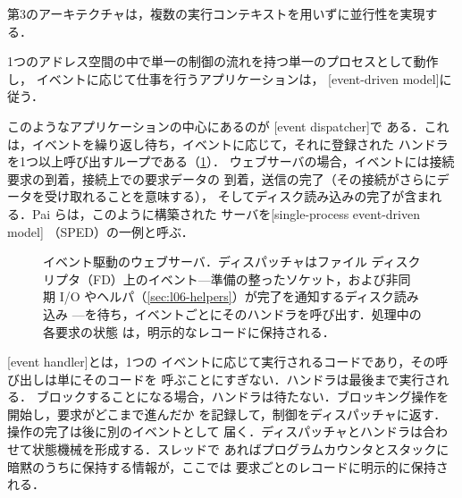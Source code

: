 \documentclass[../main.tex]{subfiles}
\begin{document}
第3のアーキテクチャは，複数の実行コンテキストを用いずに並行性を実現する．

\begin{definition}[イベント駆動モデル]
  1つのアドレス空間の中で単一の制御の流れを持つ単一のプロセスとして動作し，
  イベントに応じて仕事を行うアプリケーションは，
  [event-driven model]に
  従う．
\end{definition}

このようなアプリケーションの中心にあるのが
[event dispatcher]で
ある．これは，イベントを繰り返し待ち，イベントに応じて，それに登録された
ハンドラを1つ以上呼び出すループである（\cref{fig:l06-event-driven}）．
ウェブサーバの場合，イベントには接続要求の到着，接続上での要求データの
到着，送信の完了（その接続がさらにデータを受け取れることを意味する），
そしてディスク読み込みの完了が含まれる．Pai らは，このように構築された
サーバを[single-process event-driven model]%
（SPED）の一例と呼ぶ．

\begin{figure}[htbp]
  \centering
  
  \caption{イベント駆動のウェブサーバ．ディスパッチャはファイル
    ディスクリプタ（FD）上のイベント---準備の整ったソケット，および非同期
    I/O やヘルパ（\cref{sec:l06-helpers}）が完了を通知するディスク読み込み
    ---を待ち，イベントごとにそのハンドラを呼び出す．処理中の各要求の状態
    は，明示的なレコードに保持される．}
  \label{fig:l06-event-driven}
\end{figure}

[event handler]とは，1つの
イベントに応じて実行されるコードであり，その呼び出しは単にそのコードを
呼ぶことにすぎない．ハンドラは最後まで実行される．%
%
ブロックすることになる場合，ハンドラは待たない．ブロッキング操作を開始し，要求がどこまで進んだか
を記録して，制御をディスパッチャに返す．操作の完了は後に別のイベントとして
届く．ディスパッチャとハンドラは合わせて状態機械を形成する．スレッドで
あればプログラムカウンタとスタックに暗黙のうちに保持する情報が，ここでは
要求ごとのレコードに明示的に保持される．
\end{document}
